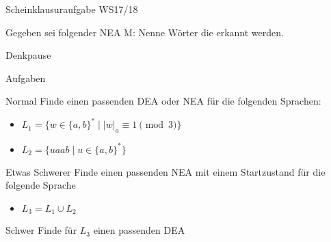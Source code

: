 {
\begin{frame}{Scheinklausuraufgabe WS17/18}
\begin{alertblock} {Gegeben sei folgender NEA M:}
Nenne Wörter die erkannt werden.\\
\end{alertblock}
\end{frame}
}

{
\begin{frame}{Denkpause}
\footnotesize
    \begin{alertblock}{Aufgaben}
    \end{alertblock}
    \begin{block}{Normal}
    Finde einen passenden DEA oder NEA für die folgenden Sprachen:
    \begin{itemize}
        \item $L_1 = \{w \in \{a,b\}^* \mid |w|_a \equiv 1 \pmod{3}\}$
        \item $L_2 = \{uaab \mid u \in \{a,b\}^*\}$
    \end{itemize}
    \end{block}
    \begin{block}{Etwas Schwerer}
    Finde einen passenden NEA mit \alert{einem Startzustand} für die folgende Sprache
    \begin{itemize}
        \item $L_3 = L_1 \cup L_2$
    \end{itemize}
    \end{block}
    \begin{block}{Schwer}
        Finde für $L_3$ einen passenden DEA
    \end{block}
\end{frame}
}

